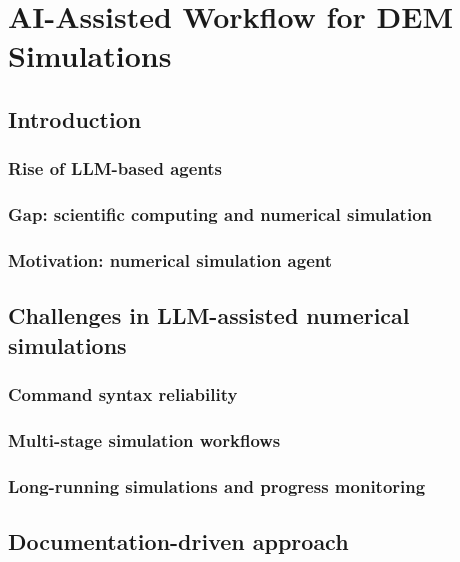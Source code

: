 \documentclass[../main]{subfiles}
\begin{document}
\chapter{AI-Assisted Workflow for DEM Simulations}
\label{ch:appendix_ai}


\section{Introduction}
\label{sec:ai_intro}

\subsection{Rise of LLM-based agents}
\subsection{Gap: scientific computing and numerical simulation}
\subsection{Motivation: numerical simulation agent}

\section{Challenges in LLM-assisted numerical simulations}
\label{sec:ai_challenges}

\subsection{Command syntax reliability}
\subsection{Multi-stage simulation workflows}
\subsection{Long-running simulations and progress monitoring}

\section{Documentation-driven approach}
\label{sec:ai_docdriven}
\end{document}
